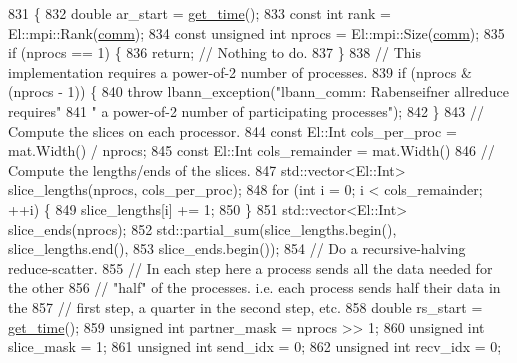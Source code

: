 \begin{DoxyCode}
831                                           \{
832   \textcolor{keywordtype}{double} ar\_start = \hyperlink{namespacelbann_a478d36031ff0659893c4322cd856157f}{get\_time}();
833   \textcolor{keyword}{const} \textcolor{keywordtype}{int} rank = El::mpi::Rank(\hyperlink{file__io_8cpp_ab048c6f9fcbcfaa57ce68b00263dbebe}{comm});
834   \textcolor{keyword}{const} \textcolor{keywordtype}{unsigned} \textcolor{keywordtype}{int} nprocs = El::mpi::Size(\hyperlink{file__io_8cpp_ab048c6f9fcbcfaa57ce68b00263dbebe}{comm});
835   \textcolor{keywordflow}{if} (nprocs == 1) \{
836     \textcolor{keywordflow}{return};  \textcolor{comment}{// Nothing to do.}
837   \}
838   \textcolor{comment}{// This implementation requires a power-of-2 number of processes.}
839   \textcolor{keywordflow}{if} (nprocs & (nprocs - 1)) \{
840     \textcolor{keywordflow}{throw} lbann\_exception(\textcolor{stringliteral}{"lbann\_comm: Rabenseifner allreduce requires"}
841                           \textcolor{stringliteral}{" a power-of-2 number of participating processes"});
842   \}
843   \textcolor{comment}{// Compute the slices on each processor.}
844   \textcolor{keyword}{const} El::Int cols\_per\_proc = mat.Width() / nprocs;
845   \textcolor{keyword}{const} El::Int cols\_remainder = mat.Width() %
846   \textcolor{comment}{// Compute the lengths/ends of the slices.}
847   std::vector<El::Int> slice\_lengths(nprocs, cols\_per\_proc);
848   \textcolor{keywordflow}{for} (\textcolor{keywordtype}{int} i = 0; i < cols\_remainder; ++i) \{
849     slice\_lengths[i] += 1;
850   \}
851   std::vector<El::Int> slice\_ends(nprocs);
852   std::partial\_sum(slice\_lengths.begin(), slice\_lengths.end(),
853                    slice\_ends.begin());
854   \textcolor{comment}{// Do a recursive-halving reduce-scatter.}
855   \textcolor{comment}{// In each step here a process sends all the data needed for the other}
856   \textcolor{comment}{// "half" of the processes. i.e. each process sends half their data in the}
857   \textcolor{comment}{// first step, a quarter in the second step, etc.}
858   \textcolor{keywordtype}{double} rs\_start = \hyperlink{namespacelbann_a478d36031ff0659893c4322cd856157f}{get\_time}();
859   \textcolor{keywordtype}{unsigned} \textcolor{keywordtype}{int} partner\_mask = nprocs >> 1;
860   \textcolor{keywordtype}{unsigned} \textcolor{keywordtype}{int} slice\_mask = 1;
861   \textcolor{keywordtype}{unsigned} \textcolor{keywordtype}{int} send\_idx = 0;
862   \textcolor{keywordtype}{unsigned} \textcolor{keywordtype}{int} recv\_idx = 0;

\end{DoxyCode}
